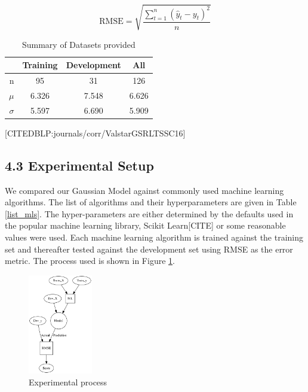 \documentclass{article}
\begin{document}
 \begin{equation}\label{eq:rmse}
  \text{RMSE} = \sqrt{\frac{\sum_{t=1}^n (\hat y_t - y_t)^2}{n}}
 \end{equation}
 \begin{table}
  \begin{center}
   \begin{tabular}{ | r | c | c || c | }
    \hline
    & Training & Development & All \\ \hline
    n               & 95 & 31 & 126 \\ \hline
    $\mu$           & 6.326 & 7.548 & 6.626 \\ \hline
    $\sigma$        & 5.597 & 6.690 & 5.909 \\ \hline
   \end{tabular}
  \end{center}
  \caption{Summary of Datasets provided}
  \label{summary_table}
 \end{table}
 [CITEDBLP:journals/corr/ValstarGSRLTSSC16]
 
 \subsection{4.3 Experimental Setup}
 We compared our Gaussian Model against commonly used machine learning algorithms. The list of algorithms and their hyperparameters are given in Table \ref{list_mls}. The hyper-parameters are either determined by the defaults used in the popular machine learning library, Scikit Learn[CITE] or some reasonable values were used. Each machine learning algorithm is trained against the training set and thereafter tested against the development set using RMSE as the error metric. The process used is shown in Figure \ref{process}.
	\begin{figure}
 	\begin{center}
   \includegraphics[width=0.25\textwidth]{process}
  \end{center}
  \caption{Experimental process}
  \label{process}
 \end{figure}

\end{document}
